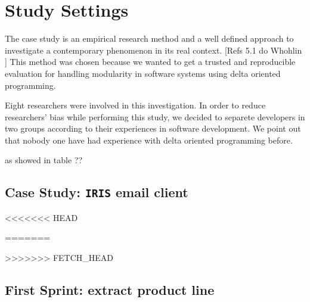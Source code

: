 \section{Study Settings}


% 

The case study is an empirical research method and a well defined approach to investigate a contemporary phenomenon in its real context. [Refs 5.1 do Whohlin ] This method was chosen because we wanted to get a trusted and reproducible evaluation for handling modularity in software systems using delta oriented programming.



Eight researchers were involved in this investigation. In order to reduce researchers’ bias while performing this study, we decided to separete developers in two groups according to their experiences in software development. We point out that nobody one have had experience with delta oriented programming before.

as  showed in table ??



\subsection{Case Study: \texttt{IRIS} email client}

%
%

<<<<<<< HEAD




=======

>>>>>>> FETCH_HEAD

\subsection{First Sprint: extract product line}

